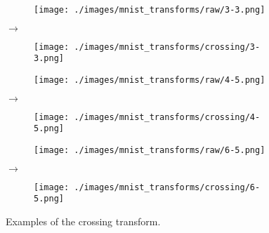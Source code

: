 \begin{figure}[H]
    \centering

    \begin{subfigure}{.15\columnwidth}
        \centering
        \texttt{[image: ./images/mnist\_transforms/raw/3-3.png]}
        \caption{}
        \label{fig:crossing_orig1}
    \end{subfigure}%
    $\rightarrow$
    \begin{subfigure}{.15\columnwidth}
        \centering
        \texttt{[image: ./images/mnist\_transforms/crossing/3-3.png]}
        \caption{}
        \label{fig:crossing_transform1}
    \end{subfigure}

    \par\medskip

    \begin{subfigure}{.15\columnwidth}
        \centering
        \texttt{[image: ./images/mnist\_transforms/raw/4-5.png]}
        \caption{}
        \label{fig:crossing_orig2}
    \end{subfigure}%
    $\rightarrow$
    \begin{subfigure}{.15\columnwidth}
        \centering
        \texttt{[image: ./images/mnist\_transforms/crossing/4-5.png]}
        \caption{}
        \label{fig:crossing_transform2}
    \end{subfigure}

    \par\medskip

    \begin{subfigure}{.15\columnwidth}
        \centering
        \texttt{[image: ./images/mnist\_transforms/raw/6-5.png]}
        \caption{}
        \label{fig:crossing_orig3}
    \end{subfigure}%
    $\rightarrow$
    \begin{subfigure}{.15\columnwidth}
        \centering
        \texttt{[image: ./images/mnist\_transforms/crossing/6-5.png]}
        \caption{}
        \label{fig:crossing_transform3}
    \end{subfigure}

    \caption{Examples of the crossing transform.}
    \label{fig:crossing_examples}
\end{figure}

